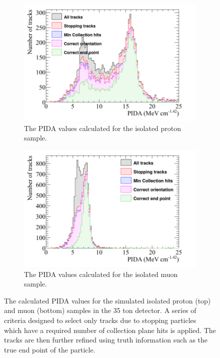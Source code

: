 \begin{figure}
  \centering
  \begin{subfigure}{0.6\textwidth}
        \centering
        \includegraphics[width=\textwidth]{IsolatedProtons_500V_Dec16_Proton_PIDA}
        \caption{The PIDA values calculated for the isolated proton sample.}
        \label{fig:Isol_PIDA_Proton}
  \end{subfigure}
  \begin{subfigure}{0.6\textwidth}
        \centering
        \includegraphics[width=\textwidth]{IsolatedMuons_500V_Dec16_Muon_PIDA}
        \caption{The PIDA values calculated for the isolated muon sample.}
        \label{fig:Isol_PIDA_Muon}
  \end{subfigure}
  \caption[The calculated PIDA values for the simulated isolated proton and muon samples in the 35 ton detector.]
          {The calculated PIDA values for the simulated isolated proton (top) and muon (bottom) samples in the 35 ton detector. A series of criteria designed to select only tracks due to stopping particles which have a required number of collection plane hits is applied. The tracks are then further refined using truth information such as the true end point of the particle.}
  \label{fig:Isol_PIDA}
\end{figure}

